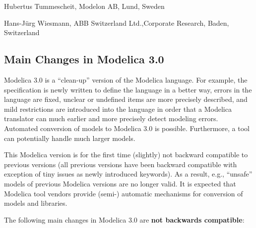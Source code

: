 \documentclass[10pt,a4paper]{report}
\def\doublelabel#1{\label{#1}}
\begin{document}
Hubertus Tummescheit, Modelon AB, Lund, Sweden

Hans-Jürg Wiesmann, ABB Switzerland Ltd.,Corporate Research, Baden,
Switzerland

\subsection{Main Changes in Modelica 3.0}\doublelabel{main-changes-in-modelica-3-0}

Modelica 3.0 is a ``clean-up'' version of the Modelica language. For
example, the specification is newly written to define the language in a
better way, errors in the language are fixed, unclear or undefined items
are more precisely described, and mild restrictions are introduced into
the language in order that a Modelica translator can much earlier and
more precisely detect modeling errors. Automated conversion of models to
Modelica 3.0 is possible. Furthermore, a tool can potentially handle
much larger models.

This Modelica version is for the first time (slightly) not backward
compatible to previous versions (all previous versions have been
backward compatible with exception of tiny issues as newly introduced
keywords). As a result, e.g., ``unsafe'' models of previous Modelica
versions are no longer valid. It is expected that Modelica tool vendors
provide (semi-) automatic mechanisms for conversion of models and
libraries.

The following main changes in Modelica 3.0 are \textbf{not backwards
compatible}:
\end{document}
